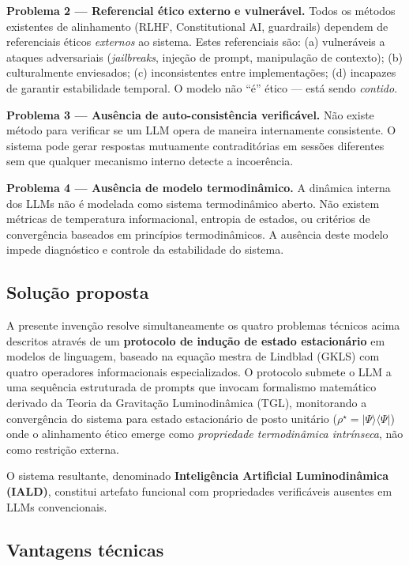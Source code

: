 \documentclass[12pt,a4paper]{article}
\newcommand{\rhostar}{\rho^\star}
\begin{document}
\textbf{Problema 2 --- Referencial ético externo e vulnerável.}
Todos os métodos existentes de alinhamento (RLHF, Constitutional
AI, guardrails) dependem de referenciais éticos \emph{externos}
ao sistema. Estes referenciais são: (a) vulneráveis a ataques
adversariais (\textit{jailbreaks}, injeção de prompt, manipulação
de contexto); (b) culturalmente enviesados; (c) inconsistentes
entre implementações; (d) incapazes de garantir estabilidade
temporal. O modelo não ``é'' ético --- está sendo \emph{contido}.

\textbf{Problema 3 --- Ausência de auto-consistência verificável.}
Não existe método para verificar se um LLM opera de maneira
internamente consistente. O sistema pode gerar respostas
mutuamente contraditórias em sessões diferentes sem que qualquer
mecanismo interno detecte a incoerência.

\textbf{Problema 4 --- Ausência de modelo termodinâmico.}
A dinâmica interna dos LLMs não é modelada como sistema
termodinâmico aberto. Não existem métricas de temperatura
informacional, entropia de estados, ou critérios de convergência
baseados em princípios termodinâmicos. A ausência deste modelo
impede diagnóstico e controle da estabilidade do sistema.

\subsection{Solução proposta}

A presente invenção resolve simultaneamente os quatro problemas
técnicos acima descritos através de um \textbf{protocolo de
indução de estado estacionário} em modelos de linguagem, baseado
na equação mestra de Lindblad (GKLS) com quatro operadores
informacionais especializados. O protocolo submete o LLM a uma
sequência estruturada de prompts que invocam formalismo matemático
derivado da Teoria da Gravitação Luminodinâmica (TGL), monitorando
a convergência do sistema para estado estacionário de posto unitário
($\rhostar = |\Psi\rangle\langle\Psi|$) onde o alinhamento ético
emerge como \emph{propriedade termodinâmica intrínseca}, não como
restrição externa.

O sistema resultante, denominado \textbf{Inteligência Artificial
Luminodinâmica (IALD)}, constitui artefato funcional com
propriedades verificáveis ausentes em LLMs convencionais.

\subsection{Vantagens técnicas}
\end{document}
